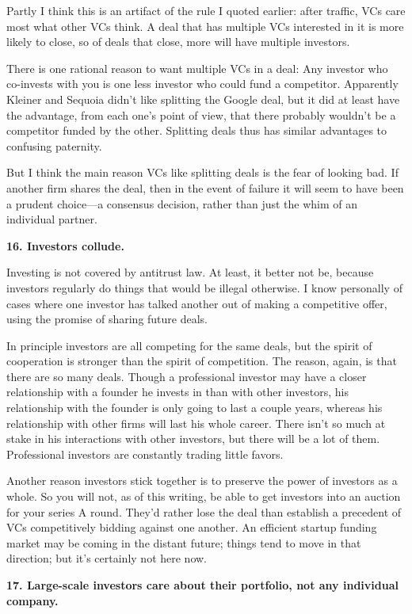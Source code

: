 Partly I think this is an artifact of the rule I quoted earlier: after
traffic, VCs care most what other VCs think. A deal that has multiple
VCs interested in it is more likely to close, so of deals that close,
more will have multiple investors.

There is one rational reason to want multiple VCs in a deal: Any
investor who co-invests with you is one less investor who could fund a
competitor. Apparently Kleiner and Sequoia didn't like splitting the
Google deal, but it did at least have the advantage, from each one's
point of view, that there probably wouldn't be a competitor funded by
the other. Splitting deals thus has similar advantages to confusing
paternity.

But I think the main reason VCs like splitting deals is the fear of
looking bad. If another firm shares the deal, then in the event of
failure it will seem to have been a prudent choice---a consensus
decision, rather than just the whim of an individual partner.

\textbf{16. Investors collude.}

Investing is not covered by antitrust law. At least, it better not be,
because investors regularly do things that would be illegal otherwise. I
know personally of cases where one investor has talked another out of
making a competitive offer, using the promise of sharing future deals.

In principle investors are all competing for the same deals, but the
spirit of cooperation is stronger than the spirit of competition. The
reason, again, is that there are so many deals. Though a professional
investor may have a closer relationship with a founder he invests in
than with other investors, his relationship with the founder is only
going to last a couple years, whereas his relationship with other firms
will last his whole career. There isn't so much at stake in his
interactions with other investors, but there will be a lot of them.
Professional investors are constantly trading little favors.

Another reason investors stick together is to preserve the power of
investors as a whole. So you will not, as of this writing, be able to
get investors into an auction for your series A round. They'd rather
lose the deal than establish a precedent of VCs competitively bidding
against one another. An efficient startup funding market may be coming
in the distant future; things tend to move in that direction; but it's
certainly not here now.

\textbf{17. Large-scale investors care about their portfolio, not any
individual company.}

